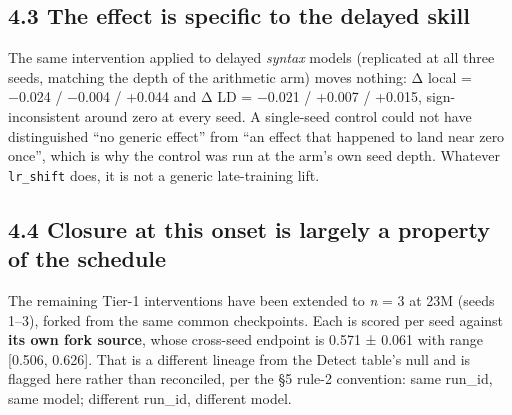 \documentclass[11pt]{article}
\begin{document}
\subsection{4.3 The effect is specific to the delayed skill}\label{the-effect-is-specific-to-the-delayed-skill}

The same intervention applied to delayed \emph{syntax} models (replicated at all three seeds,
matching the depth of the arithmetic arm) moves nothing: Δ local = −0.024 / −0.004 /
+0.044 and Δ LD = −0.021 / +0.007 / +0.015, sign-inconsistent around zero at every seed.
A single-seed control could not have distinguished ``no generic effect'' from ``an effect that
happened to land near zero once'', which is why the control was run at the arm's own seed
depth. Whatever \texttt{lr\_shift} does, it is not a generic late-training lift.

\subsection{4.4 Closure at this onset is largely a property of the schedule}\label{closure-at-this-onset-is-largely-a-property-of-the-schedule}

The remaining Tier-1 interventions have been extended to \emph{n} = 3 at 23M (seeds 1--3), forked
from the same common checkpoints. Each is scored per seed against \textbf{its own fork source},
whose cross-seed endpoint is 0.571 ± 0.061 with range {[}0.506, 0.626{]}. That is a different
lineage from the Detect table's null and is flagged here rather than reconciled, per the §5
rule-2 convention: same run\_id, same model; different run\_id, different model.
\end{document}
